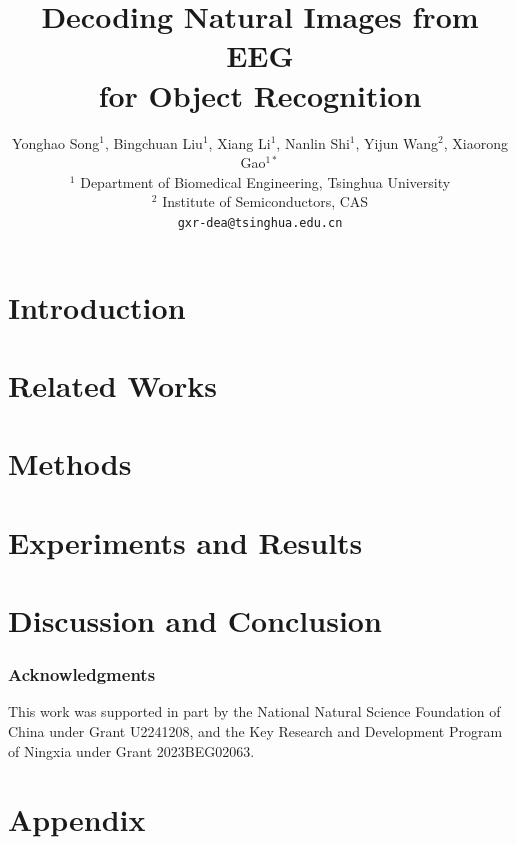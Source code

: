\documentclass{article} %
\title{Decoding Natural Images from EEG \\ for Object Recognition}
\author{Yonghao Song$^{1}$, Bingchuan Liu$^{1}$, Xiang Li$^{1}$, Nanlin Shi$^{1}$, Yijun Wang$^{2}$, Xiaorong Gao$^{1*}$ \\
$^1$ Department of Biomedical Engineering, Tsinghua University \\
$^2$ Institute of Semiconductors, CAS \\
\texttt{gxr-dea@tsinghua.edu.cn}
}
\begin{document}
\maketitle

\begin{abstract}

\end{abstract}

\section{Introduction}


\section{Related Works}


\section{Methods}


\section{Experiments and Results}



\section{Discussion and Conclusion}



\subsubsection*{Acknowledgments}

This work was supported in part by the National Natural Science Foundation of China under Grant U2241208, and the Key Research and Development Program of Ningxia under Grant 2023BEG02063.





\newpage

\appendix
\section{Appendix}

\end{document}
